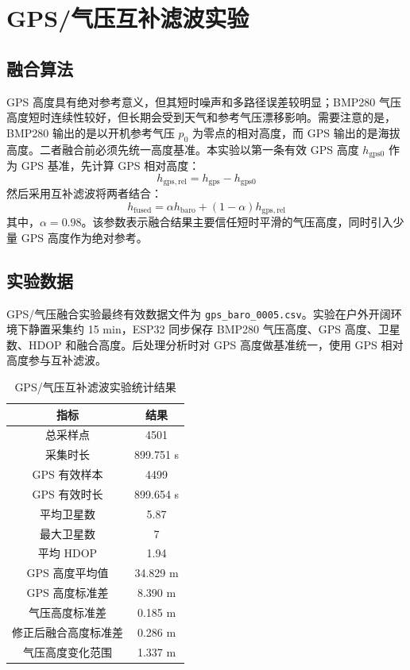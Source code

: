 \documentclass[UTF8,a4paper,12pt]{ctexart}
\begin{document}
\newpage

\section{GPS/气压互补滤波实验}

\subsection{融合算法}

GPS 高度具有绝对参考意义，但其短时噪声和多路径误差较明显；BMP280 气压高度短时连续性较好，但长期会受到天气和参考气压漂移影响。需要注意的是，BMP280 输出的是以开机参考气压 $p_0$ 为零点的相对高度，而 GPS 输出的是海拔高度。二者融合前必须先统一高度基准。本实验以第一条有效 GPS 高度 $h_{\mathrm{gps0}}$ 作为 GPS 基准，先计算 GPS 相对高度：
\begin{equation}
h_{\mathrm{gps,rel}} = h_{\mathrm{gps}} - h_{\mathrm{gps0}}
\end{equation}
然后采用互补滤波将两者结合：
\begin{equation}
h_{\mathrm{fused}} = \alpha h_{\mathrm{baro}} + (1-\alpha) h_{\mathrm{gps,rel}}
\end{equation}
其中，$\alpha=0.98$。该参数表示融合结果主要信任短时平滑的气压高度，同时引入少量 GPS 高度作为绝对参考。

\subsection{实验数据}

GPS/气压融合实验最终有效数据文件为 \texttt{gps\_baro\_0005.csv}。实验在户外开阔环境下静置采集约 15 min，ESP32 同步保存 BMP280 气压高度、GPS 高度、卫星数、HDOP 和融合高度。后处理分析时对 GPS 高度做基准统一，使用 GPS 相对高度参与互补滤波。

\begin{table}[H]
\centering
\caption{GPS/气压互补滤波实验统计结果}
\begin{tabular}{cc}
\toprule
指标 & 结果 \\
\midrule
总采样点 & 4501 \\
采集时长 & 899.751 s \\
GPS 有效样本 & 4499 \\
GPS 有效时长 & 899.654 s \\
平均卫星数 & 5.87 \\
最大卫星数 & 7 \\
平均 HDOP & 1.94 \\
GPS 高度平均值 & 34.829 m \\
GPS 高度标准差 & 8.390 m \\
气压高度标准差 & 0.185 m \\
修正后融合高度标准差 & 0.286 m \\
气压高度变化范围 & 1.337 m \\
\bottomrule
\end{tabular}
\end{table}
\end{document}
